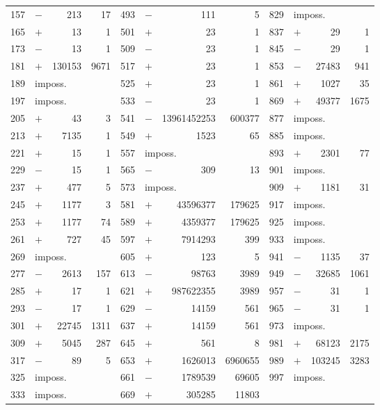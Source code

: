 \documentclass[11pt,a4paper]{book}
\theoremstyle{plain}
\begin{document}
\begin{center}
\begin{tabular}{|r|c|r|r||r|c|r|r||r|c|r|r|}
157 & $-$ & 213 & 17  & 493 & $-$ & 111 & 5      & 829 & \multicolumn{3}{l|}{imposs.} \\
165 & $+$ & 13 & 1    & 501 & $+$ & 23 & 1       & 837 & $+$ & 29 & 1 \\
173 & $-$ & 13 & 1    & 509 & $-$ & 23 & 1       & 845 & $-$ & 29 & 1 \\
181 & $+$ & 130153 & 9671 & 517 & $+$ & 23 & 1   & 853 & $-$ & 27483 & 941 \\
189 & \multicolumn{3}{l||}{imposs.} & 525 & $+$ & 23 & 1   & 861 & $+$ & 1027 & 35 \\
197 & \multicolumn{3}{l||}{imposs.} & 533 & $-$ & 23 & 1   & 869 & $+$ & 49377 & 1675 \\
205 & $+$ & 43 & 3    & 541 & $-$ & 13961452253 & 600377   & 877 & \multicolumn{3}{l|}{imposs.} \\
213 & $+$ & 7135 & 1  & 549 & $+$ & 1523 & 65    & 885 & \multicolumn{3}{l|}{imposs.} \\
221 & $+$ & 15 & 1    & 557 & \multicolumn{3}{l||}{imposs.} & 893 & $+$ & 2301 & 77 \\
229 & $-$ & 15 & 1    & 565 & $-$ & 309 & 13     & 901 & \multicolumn{3}{l|}{imposs.} \\
237 & $+$ & 477 & 5   & 573 & \multicolumn{3}{l||}{imposs.} & 909 & $+$ & 1181 & 31 \\
245 & $+$ & 1177 & 3  & 581 & $+$ & 43596377 & 179625      & 917 & \multicolumn{3}{l|}{imposs.} \\
253 & $+$ & 1177 & 74 & 589 & $+$ & 4359377 & 179625 & 925 & \multicolumn{3}{l|}{imposs.} \\
261 & $+$ & 727 & 45  & 597 & $+$ & 7914293 & 399 & 933 & \multicolumn{3}{l|}{imposs.} \\
269 & \multicolumn{3}{l||}{imposs.} & 605 & $+$ & 123 & 5  & 941 & $-$ & 1135 & 37 \\
277 & $-$ & 2613 & 157 & 613 & $-$ & 98763 & 3989 & 949 & $-$ & 32685 & 1061 \\
285 & $+$ & 17 & 1    & 621 & $+$ & 987622355 & 3989  & 957 & $-$ & 31 & 1 \\
293 & $-$ & 17 & 1    & 629 & $-$ & 14159 & 561  & 965 & $-$ & 31 & 1 \\
301 & $+$ & 22745 & 1311 & 637 & $+$ & 14159 & 561 & 973 & \multicolumn{3}{l|}{imposs.} \\
309 & $+$ & 5045 & 287 & 645 & $+$ & 561 & 8    & 981 & $+$ & 68123 & 2175 \\
317 & $-$ & 89 & 5    & 653 & $+$ & 1626013 & 6960655 & 989 & $+$ & 103245 & 3283 \\
325 & \multicolumn{3}{l||}{imposs.} & 661 & $-$ & 1789539 & 69605 & 997 & \multicolumn{3}{l|}{imposs.} \\
333 & \multicolumn{3}{l||}{imposs.} & 669 & $+$ & 305285 & 11803 & \multicolumn{4}{l|}{} \\
\hline
\end{tabular}
\end{center}
\end{document}
